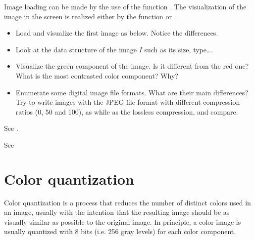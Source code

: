 \begin{mcomment}
\begin{mremark}Image loading can be made by the use of the \matlabregistered{} function . 
The visualization of the image in the screen is realized either by the \matlabregistered{} function  or .
\end{mremark}
\end{mcomment}

\begin{qbox}
\begin{itemize}
\item Load and visualize the first image as below. Notice the differences.
 \item Look at the data structure of the image $I$ such as its size, type\dots.
\item Visualize the green component of the image.
Is it different from the red one? What is the most contrasted color component? Why? 
\item Enumerate some digital image file formats. 
What are their main differences? 
Try to write images with the JPEG file format with different compression ratios (0, 50 and 100), as while as the lossless compression, and compare.
\end{itemize}
\end{qbox}

\begin{mcomment}
 \begin{mremark}
  See .
 \end{mremark}
\end{mcomment}

\begin{pcomment}
 \begin{premark}
  See 
 \end{premark}

\end{pcomment}

\section{Color quantization}
Color quantization is a process that reduces the number of distinct colors used in an image, usually with the intention that the resulting image should be as visually similar as possible to the original image. In principle, a color image is usually quantized with 8 bits (i.e. 256 gray levels) for each color component.

